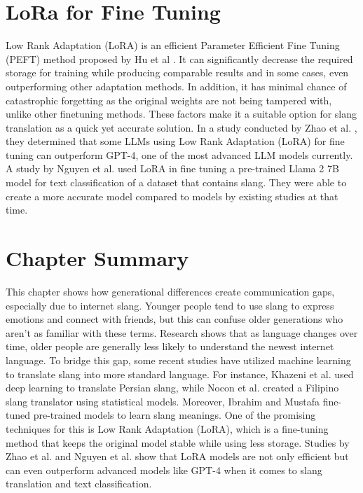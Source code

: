 \section{LoRa for Fine Tuning}
Low Rank Adaptation (LoRA) is an efficient Parameter Efficient Fine Tuning (PEFT) method proposed by Hu et al \cite{hu2021loralowrankadaptationlarge}. It can significantly decrease the required storage for training while producing comparable results and in some cases, even outperforming other adaptation methods. In addition, it has minimal chance of catastrophic forgetting as the original weights are not being tampered with, unlike other finetuning methods. These factors make it a suitable option for slang translation as a quick yet accurate solution. In a study conducted by Zhao et al. \cite{zhao2024loraland310finetuned}, they determined that some LLMs using Low Rank Adaptation (LoRA) for fine tuning can outperform GPT-4, one of the most advanced LLM models currently. A study by Nguyen et al. \cite{nguyen2023finetuningllama2large} used LoRA in fine tuning a pre-trained Llama 2 7B model for text classification of a dataset that contains slang. They were able to create a more accurate model compared to models by existing studies at that time. 

\section{Chapter Summary}
This chapter shows how generational differences create communication gaps, especially due to internet slang. Younger people tend to use slang to express emotions and connect with friends, but this can confuse older generations who aren't as familiar with these terms. Research shows that as language changes over time, older people are generally less likely to understand the newest internet language. To bridge this gap, some recent studies have utilized machine learning to translate slang into more standard language. For instance, Khazeni et al. \cite{Khazeni} used deep learning to translate Persian slang, while Nocon et al. \cite{Nocon_Kho_Arroyo_2018} created a Filipino slang translator using statistical models. Moreover, Ibrahim and Mustafa \cite{Abdulstar_Ibrahim_Shareef_Mustafa_2023} fine-tuned pre-trained models to learn slang meanings. One of the promising techniques for this is Low Rank Adaptation (LoRA), which is a fine-tuning method that keeps the original model stable while using less storage. Studies by Zhao et al. \cite{zhao2024loraland310finetuned} and Nguyen et al. \cite{nguyen2023finetuningllama2large} show that LoRA models are not only efficient but can even outperform advanced models like GPT-4 when it comes to slang translation and text classification. 